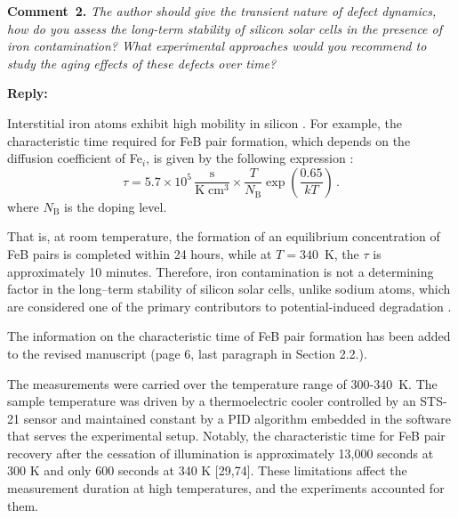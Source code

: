 \documentclass[a4paper,fleqn]{cas-sc}
\begin{document}
\vspace{1cm}
\noindent
\textcolor[rgb]{0.00,0.50,1.00}{\textbf{Comment~2.}}
\emph{ The author should give the transient nature of defect dynamics, how do you assess the long-term stability of silicon solar cells in the presence of iron contamination? What experimental approaches would you recommend to study the aging effects of these defects over time?}


\noindent
\textcolor[rgb]{0.51,0.00,0.00}{\textbf{Reply:}}

Interstitial iron atoms exhibit high mobility in silicon \cite{Istratov1999}.
For example, the characteristic time required for FeB pair formation,
which depends on the diffusion coefficient of Fe$_i$, is given by the following expression \cite{FeBAssJAP2014,FeBKin2019,FeBAssSST2011}:
\begin{equation}
\label{eqTass}
\tau=5.7\times10^5\,\frac{\mathrm{s}}{\mathrm{K}\;\mathrm{cm}^3}\times\frac{T}{N_\mathrm{B}}\exp\left(\frac{0.65}{kT}\right)\,.
\end{equation}
where
$N_\mathrm{B}$ is the doping level.

That is, at room temperature, the formation of an equilibrium concentration of FeB pairs is completed within 24 hours,
while at $T=340$~K, the $\tau$ is approximately 10 minutes.
Therefore, iron contamination is not a determining factor in the long--term stability of silicon solar cells, unlike sodium atoms, which are considered one
of the primary contributors to potential-induced degradation \cite{Yamaguchi2021}.


The information on the characteristic time of FeB pair formation has been added to the revised manuscript (page 6, last paragraph in Section 2.2.).

\begin{mdframed}
The measurements were carried over the temperature range of 300-340~K.
The sample temperature was driven by a thermoelectric cooler controlled by an STS-21 sensor
and maintained constant by a PID algorithm embedded in the software that serves the experimental setup.
\textcolor[rgb]{1.00,0.07,0.00}{Notably, the characteristic time for FeB pair recovery after the cessation of illumination is approximately 13,000 seconds at 300 K
and only 600 seconds at 340 K [29,74].
These limitations affect the measurement duration at high temperatures, and the experiments accounted for them.}
\end{mdframed}
\end{document}
